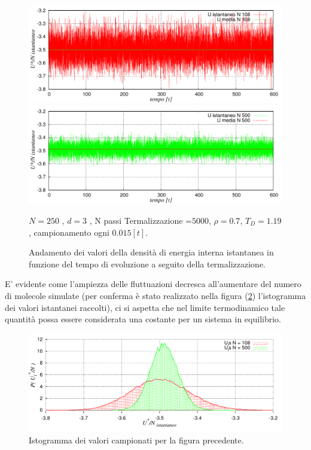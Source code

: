 	\begin{figure}[htbp]
		\centering
		\caption[Sfere Soffici$/$Problema9.cpp]{Andamento dei valori della densità di energia interna istantanea in funzione del tempo di evoluzione a seguito della termalizzazione.}\label{fig: Problema9}\vspace{-15pt}

		\includegraphics[scale=0.75]{Immagini/Soffici/UvsStepN108}

		\includegraphics[scale=0.75]{Immagini/Soffici/UvsStepN500}

		\centering  \footnotesize{$N= 250$ , $d=3$ , N passi Termalizzazione =$ 5000$, $\rho = 0.7$,	$T_D=1.19$, campionamento ogni $0.015 [t]$.}
	\end{figure}

E' evidente come l'ampiezza delle fluttuazioni decresca all'aumentare del numero di molecole simulate (per conferma è stato realizzato nella figura (\ref{fig: Isto_Problema9}) l'istogramma dei valori istantanei raccolti), ci si aspetta che nel limite termodinamico tale quantità possa essere considerata una costante per un sistema in equilibrio.

	\begin{figure}[htbp]
			\centering
		\caption[Sfere Soffici$/$Problema9.cpp]{Istogramma dei valori campionati per la figura precedente.}\label{fig: Isto_Problema9}\vspace{-15pt}

		\includegraphics[scale=0.85]{Immagini/Soffici/IstoU}

	\end{figure}
	
